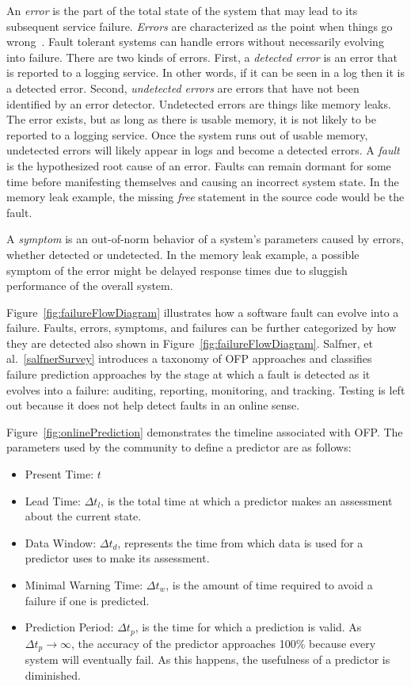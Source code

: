 An \emph{error} is the part of the total state of the system that may lead to
its subsequent service failure.  \emph{Errors} are characterized as the point
when things go wrong~\cite{salfnerSurvey}.  Fault tolerant systems can handle
errors without necessarily evolving into failure.  There are two kinds of
errors.  First, a \emph{detected error} is an error that is reported to a
logging service.  In other words, if it can be seen in a log then it is a
detected error.  Second, \emph{undetected errors} are errors that have not been
identified by an error detector.  Undetected errors are things like memory
leaks.  The error exists, but as long as there is usable memory, it is not
likely to be reported to a logging service.  Once the system runs out of usable
memory, undetected errors will likely appear in logs and become a detected
errors.  A \emph{fault} is the hypothesized root cause of an error.  Faults can
remain dormant for some time before manifesting themselves and causing an
incorrect system state.  In the memory leak example, the missing \emph{free}
statement in the source code would be the fault.  

A \emph{symptom} is an out-of-norm behavior of a system's parameters caused by
errors, whether detected or undetected.  In the memory leak example, a possible
symptom of the error might be delayed response times due to sluggish
performance of the overall system.

\figfailureFlowDiagram

Figure~\ref{fig:failureFlowDiagram} illustrates how a software fault can evolve
into a failure.  Faults, errors, symptoms, and failures can be further
categorized by how they are detected also shown in
Figure~\ref{fig:failureFlowDiagram}.  Salfner, et al.~\ref{salfnerSurvey}
introduces a taxonomy of OFP approaches and classifies failure prediction
approaches by the stage at which a fault is detected as it evolves into a
failure: auditing, reporting, monitoring, and tracking.  Testing is left out
because it does not help detect faults in an online sense.  

\figonlinePrediction

Figure~\ref{fig:onlinePrediction} demonstrates the timeline associated with
OFP.  The parameters used by the community to define a predictor are as
follows:
\begin{itemize}
	\item{Present Time: $t$}
  \item{Lead Time: $\Delta t_{l}$, is the total time at which a predictor makes
  an assessment about the current state.}
  \item{Data Window: $\Delta t_{d}$, represents the time from which data is
  used for a predictor uses to make its assessment.}
  \item{Minimal Warning Time: $\Delta t_{w}$, is the amount of time required to
  avoid a failure if one is predicted.}
  \item{Prediction Period: $\Delta t_{p}$, is the time for which a prediction
  is valid.  As $\Delta t_{p} \rightarrow \infty$, the accuracy of the
  predictor approaches 100\% because every system will eventually fail.  As
  this happens, the usefulness of a predictor is diminished.}
\end{itemize}

